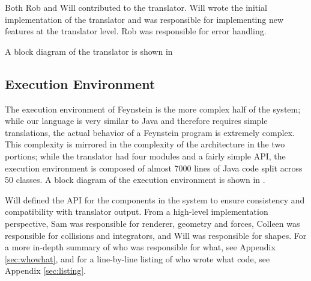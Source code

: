 Both Rob and Will contributed to the translator. Will wrote the
initial implementation of the translator and was responsible for
implementing new features at the translator level. Rob was responsible
for error handling.

A block diagram of the translator is shown in 


\subsection{Execution Environment}

The execution environment of Feynstein is the more complex half of the
system; while our language is very similar to Java and therefore
requires simple translations, the actual behavior of a Feynstein
program is extremely complex. This complexity is mirrored in the
complexity of the architecture in the two portions; while the
translator had four modules and a fairly simple API, the execution
environment is composed of almost 7000 lines of Java code split across
50 classes. A block diagram of the execution environment is shown in
.

Will defined the API for the components in the system to ensure
consistency and compatibility with translator output. From a
high-level implementation perspective, Sam was responsible for
renderer, geometry and forces, Colleen was responsible for collisions
and integrators, and Will was responsible for shapes. For a more
in-depth summary of who was responsible for what, see Appendix
\ref{sec:whowhat}, and for a line-by-line listing of who wrote what
code, see Appendix \ref{sec:listing}.

